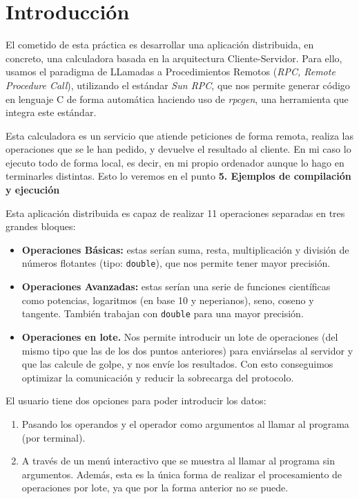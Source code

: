 \documentclass[a4paper,12pt]{article}
\begin{document}
\tableofcontents
\newpage %

\section{Introducción}

	El cometido de esta práctica es desarrollar una aplicación distribuida, en
	concreto, una calculadora basada en la arquitectura Cliente-Servidor. Para
	ello, usamos el paradigma de LLamadas a Procedimientos Remotos (\textit{RPC,
		Remote Procedure Call}), utilizando el estándar \textit{Sun RPC}, que nos
	permite generar código en lenguaje C de forma automática haciendo uso de
	\textit{rpcgen}, una herramienta que integra este estándar.
	
	Esta calculadora es un servicio que atiende peticiones de forma remota, realiza
	las operaciones que se le han pedido, y devuelve el resultado al cliente. En mi
	caso lo ejecuto todo de forma local, es decir, en mi propio ordenador aunque lo
	hago en terminarles distintas. Esto lo veremos en el punto \textbf{5. Ejemplos de compilación y ejecución}
		
	Esta aplicación distribuida es capaz de realizar 11 operaciones separadas en
	tres grandes bloques:
	
	\begin{itemize}
		\item \textbf{Operaciones Básicas:} estas serían suma, resta, multiplicación y división de números flotantes (tipo: \texttt{double}), que nos permite tener mayor precisión.
	
		\item \textbf{Operaciones Avanzadas:} estas serían una serie de funciones científicas como potencias, logaritmos (en base 10 y neperianos), seno, coseno y tangente. También trabajan con \texttt{double} para una mayor precisión.
	
		\item \textbf{Operaciones en lote.} Nos permite introducir un lote de operaciones (del mismo tipo que las de los dos puntos anteriores) para enviárselas al servidor y que las calcule de golpe, y nos envíe los resultados. Con esto conseguimos optimizar la comunicación y reducir la sobrecarga del protocolo.
	\end{itemize}
	
	El usuario tiene dos opciones para poder introducir los datos:
	
	\begin{enumerate}
		\item Pasando los operandos y el operador como argumentos al llamar al programa (por
		      terminal).
		\item A través de un menú interactivo que se muestra al llamar al programa sin
		      argumentos. Además, esta es la única forma de realizar el procesamiento de
		      operaciones por lote, ya que por la forma anterior no se puede.
	\end{enumerate}
	
\end{document}
